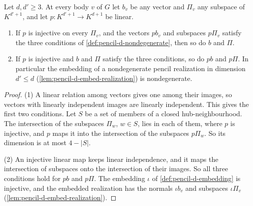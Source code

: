 \begin{lemma}
  \label{lem:pencil-d-nondegenerate-maps}
  \leanok
  Let $d, d' \ge 3$. At every body $v$ of $G$ let $b_v$ be any vector and
  $\Pi_v$ any subspace of $K^{d'+1}$, and let
  $p \colon K^{d'+1} \to K^{d+1}$ be linear.
  \begin{enumerate}
    \item If $p$ is injective on every $\Pi_v$, and the vectors $p b_v$
      and subspaces $p\Pi_v$ satisfy the three conditions of
      \cref{def:pencil-d-nondegenerate}, then so do $b$ and $\Pi$.
    \item If $p$ is injective and $b$ and $\Pi$ satisfy the three
      conditions, so do $p b$ and $p \Pi$. In particular the embedding of
      a nondegenerate pencil realization in dimension $d' \le d$
      (\cref{lem:pencil-d-embed-realization}) is nondegenerate.
  \end{enumerate}
\end{lemma}
\begin{proof}
  \leanok
  (1) A linear relation among vectors gives one among their images, so
  vectors with linearly independent images are linearly independent.
  This gives the first two conditions. Let $S$ be a set of members of a
  closed hub-neighbourhood. The intersection of the subspaces $\Pi_w$,
  $w \in S$, lies in each of them, where $p$ is injective, and $p$ maps
  it into the intersection of the subspaces $p\Pi_w$. So its dimension is
  at most $4 - |S|$.

  (2) An injective linear map keeps linear independence, and it maps the
  intersection of subspaces onto the intersection of their images. So all
  three conditions hold for $pb$ and $p\Pi$. The embedding $\iota$ of
  \cref{def:pencil-d-embedding} is injective, and the embedded
  realization has the normals $\iota b_v$ and subspaces $\iota \Pi_v$
  (\cref{lem:pencil-d-embed-realization}).
\end{proof}

